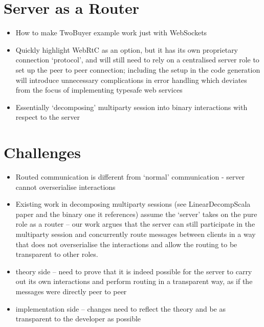 \section{Server as a Router}
\begin{itemize}
\item How to make TwoBuyer example work just with WebSockets
\item Quickly highlight WebRtC as an option, but it has its own proprietary connection `protocol', and will still need to rely on a centralised server role to set up the peer to peer connection; including the setup in the code generation will introduce unnecessary complications in error handling which deviates from the focus of implementing typesafe web services
\item Essentially `decomposing' multiparty session into binary interactions with respect to the server
\end{itemize}

\section{Challenges}
\begin{itemize}
\item Routed communication is different from `normal' communication
- server cannot overserialise interactions
\item Existing work in decomposing multiparty sessions (see LinearDecompScala paper and the binary one it references) assume the `server' takes on the pure role as a router -- our work argues that the server can still participate in the multiparty session and concurrently route messages between clients in a way that does not overserialise the interactions and allow the routing to be transparent to other roles.
\item theory side -- need to prove that it is indeed possible for the server to carry out its own interactions and perform routing in a transparent way, as if the messages were directly peer to peer
\item implementation side -- changes need to reflect the theory and be as transparent to the developer as possible
\end{itemize}